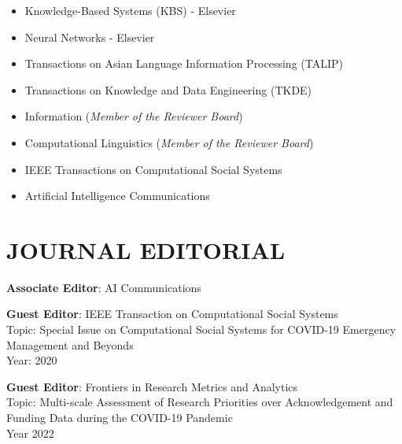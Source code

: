\documentclass[margin]{res}
\begin{document}
\begin{resume}
\begin{itemize}
\item Knowledge-Based Systems (KBS) - Elsevier \\
\item Neural Networks - Elsevier \\
\item Transactions on Asian Language Information Processing (TALIP) \\
\item Transactions on Knowledge and Data Engineering (TKDE) \\
\item Information (\textit{Member of the Reviewer Board}) \\
\item Computational Linguistics (\textit{Member of the Reviewer Board}) \\
\item IEEE Transactions on Computational Social Systems \\
\item Artificial Intelligence Communications
\end{itemize}

\section{JOURNAL EDITORIAL}
\textbf{Associate Editor}: AI Communications

\textbf{Guest Editor}: IEEE Transaction on Computational Social Systems\\
Topic: Special Issue on Computational Social Systems for COVID-19 Emergency Management and Beyonds \\
Year: 2020

\textbf{Guest Editor}: Frontiers in Research Metrics and Analytics \\
Topic: Multi-scale Assessment of Research Priorities over Acknowledgement and Funding Data during the COVID-19 Pandemic \\
Year 2022


\end{resume}
\end{document}
